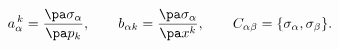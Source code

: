 \begin{equation}
a_{\alpha}\sp{\,k}=\frac{\pa \sigma_\alpha}{\pa p_{k}},
\qquad
b_{\alpha k}=\frac{\pa \sigma_\alpha}{\pa x\sp{k}},
\qquad
C_{\alpha \beta}=\{\sigma_\alpha,\sigma_\beta\}.
\label{diracginv}
\end{equation}

